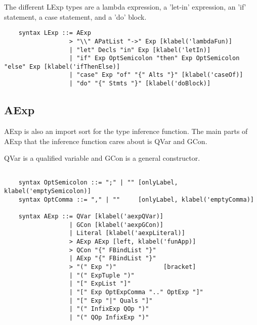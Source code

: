 The different LExp types are a lambda expression, a 'let-in' expression, an 'if' statement, a case statement, and a 'do' block.

\begin{lstlisting}
    syntax LExp ::= AExp
                  > "\\" APatList "->" Exp [klabel('lambdaFun)]
                  | "let" Decls "in" Exp [klabel('letIn)]
                  | "if" Exp OptSemicolon "then" Exp OptSemicolon "else" Exp [klabel('ifThenElse)]
                  | "case" Exp "of" "{" Alts "}" [klabel('caseOf)]
                  | "do" "{" Stmts "}" [klabel('doBlock)]

\end{lstlisting}

\subsection{AExp}
AExp is also an import sort for the type inference function. The main parts of AExp that the inference function cares about is QVar and GCon.

QVar is a qualified variable and GCon is a general constructor.

\begin{lstlisting}

    syntax OptSemicolon ::= ";" | "" [onlyLabel, klabel('emptySemicolon)]
    syntax OptComma ::= "," | ""     [onlyLabel, klabel('emptyComma)]

    syntax AExp ::= QVar [klabel('aexpQVar)]
                  | GCon [klabel('aexpGCon)]
                  | Literal [klabel('aexpLiteral)]
                  > AExp AExp [left, klabel('funApp)]
                  > QCon "{" FBindList "}"
                  | AExp "{" FBindList "}"
                  > "(" Exp ")"             [bracket]
                  | "(" ExpTuple ")"
                  | "[" ExpList "]"
                  | "[" Exp OptExpComma ".." OptExp "]"
                  | "[" Exp "|" Quals "]"
                  | "(" InfixExp QOp ")"
                  | "(" QOp InfixExp ")"
                           
\end{lstlisting}

